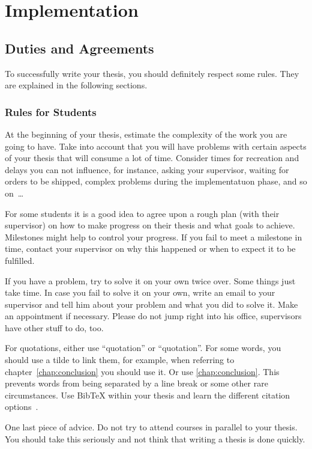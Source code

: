 \chapter{Implementation} \label{chap:impl}

\section{Duties and Agreements}

To successfully write your thesis, you should definitely respect some rules. They are explained in the following sections.

\subsection{Rules for Students}
At the beginning of your thesis, estimate the complexity of the work you are going to have. Take into account that you will have problems with certain aspects of your thesis that will consume a lot of time. Consider times for recreation and delays you can not influence, for instance, asking your supervisor, waiting for orders to be shipped, complex problems during the implementatuon phase, and so on~\dots

For some students it is a good idea to agree upon a rough plan (with their supervisor) on how to make progress on their thesis and what goals to achieve. Milestones might help to control your progress. If you fail to meet a milestone in time, contact your supervisor on why this happened or when to expect it to be fulfilled.

If you have a problem, try to solve it on your own twice over. Some things just take time. In case you fail to solve it on your own, write an email to your supervisor and tell him about your problem and what you did to solve it. Make an appointment if necessary. Please do not jump right into his office, supervisors have other stuff to do, too.

For quotations, either use ``quotation'' or \enquote{quotation}. For some words, you should use a tilde to link them, for example, when referring to chapter~\ref{chap:conclusion} you should use it. Or use \autoref{chap:conclusion}. This prevents words from being separated by a line break or some other rare circumstances. Use BibTeX within your thesis and learn the different citation options~\cite{Xie:2008:SBS,Newsome:05:DTA}. 

One last piece of advice. Do not try to attend courses in parallel to your thesis. You should take this seriously and not think that writing a thesis is done quickly.

